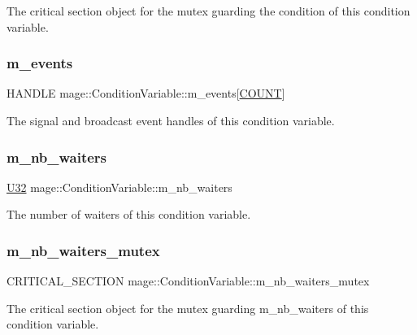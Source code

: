 The critical section object for the mutex guarding the condition of this condition variable. \hypertarget{structmage_1_1_condition_variable_a00691d5e29735da356f577bb5522017d}{}\label{structmage_1_1_condition_variable_a00691d5e29735da356f577bb5522017d} 
\subsubsection{\texorpdfstring{m\+\_\+events}{m\_events}}
{\footnotesize\ttfamily H\+A\+N\+D\+LE mage\+::\+Condition\+Variable\+::m\+\_\+events\mbox{[}\hyperlink{structmage_1_1_condition_variable_ae7627253bf4faebc0aae84a77920d195a553680ab09f088489b7d9f3cef9a5e14}{C\+O\+U\+NT}\mbox{]}\hspace{0.3cm}{\ttfamily [private]}}

The signal and broadcast event handles of this condition variable. \hypertarget{structmage_1_1_condition_variable_a1166a25b69eb4b510b551c6c74a13046}{}\label{structmage_1_1_condition_variable_a1166a25b69eb4b510b551c6c74a13046} 
\subsubsection{\texorpdfstring{m\+\_\+nb\+\_\+waiters}{m\_nb\_waiters}}
{\footnotesize\ttfamily \hyperlink{namespacemage_a41c104c036fba3756a74e19f793eeaa1}{U32} mage\+::\+Condition\+Variable\+::m\+\_\+nb\+\_\+waiters\hspace{0.3cm}{\ttfamily [private]}}

The number of waiters of this condition variable. \hypertarget{structmage_1_1_condition_variable_a0686e682d62d44ff1eb9ac45acbb0eab}{}\label{structmage_1_1_condition_variable_a0686e682d62d44ff1eb9ac45acbb0eab} 
\subsubsection{\texorpdfstring{m\+\_\+nb\+\_\+waiters\+\_\+mutex}{m\_nb\_waiters\_mutex}}
{\footnotesize\ttfamily C\+R\+I\+T\+I\+C\+A\+L\+\_\+\+S\+E\+C\+T\+I\+ON mage\+::\+Condition\+Variable\+::m\+\_\+nb\+\_\+waiters\+\_\+mutex\hspace{0.3cm}{\ttfamily [private]}}

The critical section object for the mutex guarding {\ttfamily m\+\_\+nb\+\_\+waiters} of this condition variable. 